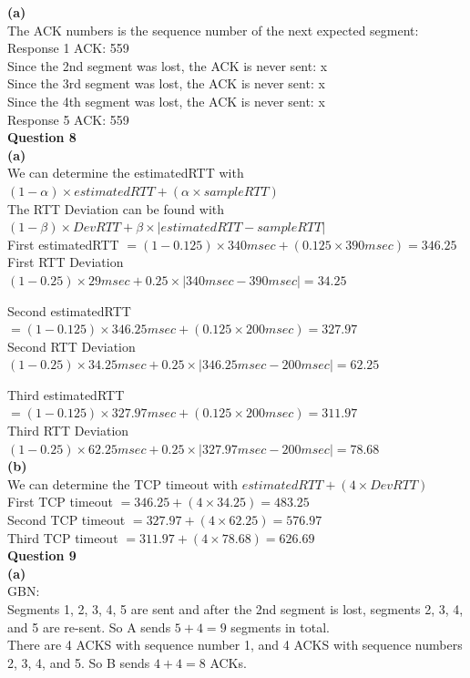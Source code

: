 \documentclass{article}
\begin{document}
\bigskip
{\bf (a)}\\
The ACK numbers is the sequence number of the next expected segment:\\
Response 1 ACK: 559\\
Since the 2nd segment was lost, the ACK is never sent: x\\
Since the 3rd segment was lost, the ACK is never sent: x\\
Since the 4th segment was lost, the ACK is never sent: x\\
Response 5 ACK: 559\\

\bigskip
{\bf Question 8}\\
{\bf (a)}\\
We can determine the estimatedRTT with $(1-\alpha) \times estimatedRTT + (\alpha \times sampleRTT)$\\
The RTT Deviation can be found with $(1-\beta) \times DevRTT + \beta \times |estimatedRTT - sampleRTT|$\\

\smallskip
First estimatedRTT $=(1-0.125) \times 340msec + (0.125 \times 390msec)=346.25$\\
First RTT Deviation $(1-0.25) \times 29msec + 0.25 \times |340msec - 390msec|=34.25$

\smallskip
Second estimatedRTT $=(1-0.125) \times 346.25msec + (0.125 \times 200msec)=327.97$\\
Second RTT Deviation $(1-0.25) \times 34.25msec + 0.25 \times |346.25msec - 200msec|=62.25$

\smallskip
Third estimatedRTT $=(1-0.125) \times 327.97msec + (0.125 \times 200msec)=311.97$\\
Third RTT Deviation $(1-0.25) \times 62.25msec + 0.25 \times |327.97msec - 200msec|=78.68$\\

\smallskip
{\bf (b)}\\
We can determine the TCP timeout with $estimatedRTT+(4 \times DevRTT)$\\
First TCP timeout $=346.25+(4 \times 34.25)=483.25$\\
Second TCP timeout $=327.97+(4 \times 62.25)=576.97$\\
Third TCP timeout $=311.97+(4 \times 78.68)=626.69$\\

\bigskip
{\bf Question 9}\\
{\bf (a)}\\
GBN:\\
Segments 1, 2, 3, 4, 5 are sent and after the 2nd segment is lost,
segments 2, 3, 4, and 5 are re-sent. So A sends $5+4=9$ segments in total.\\
There  are  4  ACKS  with  sequence  number  1,  and  4  ACKS  with 
sequence numbers 2, 3, 4, and 5. So B sends $4+4=8$ ACKs.\\
\end{document}
